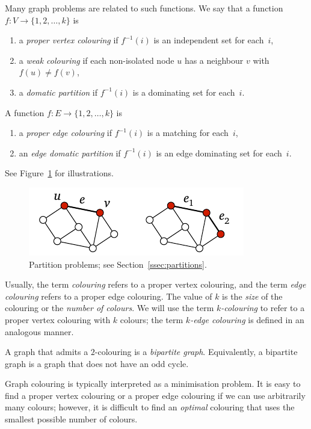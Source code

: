 Many graph problems are related to such functions. We say that a function $f\colon V \to \{1,2,\dotsc,k\}$ is
\begin{enumerate}
    \item a \emph{proper vertex colouring} if $f^{-1}(i)$ is an independent set for each~$i$,
    \item a \emph{weak colouring} if each non-isolated node $u$ has a neighbour $v$ with $f(u) \ne f(v)$,
    \item a \emph{domatic partition} if $f^{-1}(i)$ is a dominating set for each~$i$.
\end{enumerate}
A function $f\colon E \to \{1,2,\dotsc,k\}$ is
\begin{enumerate}[resume]
    \item a \emph{proper edge colouring} if $f^{-1}(i)$ is a matching for each~$i$,
    \item an \emph{edge domatic partition} if $f^{-1}(i)$ is an edge dominating set for each~$i$.
\end{enumerate}
See Figure~\ref{fig:partitions} for illustrations.
\begin{figure}
    \centering
    \includegraphics[page=\PPartitions]{figs.pdf}
    \caption{Partition problems; see Section~\ref{ssec:partitions}.}\label{fig:partitions}
\end{figure}

Usually, the term \emph{colouring} refers to a proper vertex colouring, and the term \emph{edge colouring} refers to a proper edge colouring. The value of $k$ is the \emph{size} of the colouring or the \emph{number of colours}. We will use the term \emph{$k$-colouring} to refer to a proper vertex colouring with $k$ colours; the term \emph{$k$-edge colouring} is defined in an analogous manner.

A graph that admits a $2$-colouring is a \emph{bipartite graph}. Equivalently, a bipartite graph is a graph that does not have an odd cycle.

Graph colouring is typically interpreted as a minimisation problem. It is easy to find a proper vertex colouring or a proper edge colouring if we can use arbitrarily many colours; however, it is difficult to find an \emph{optimal} colouring that uses the smallest possible number of colours.

